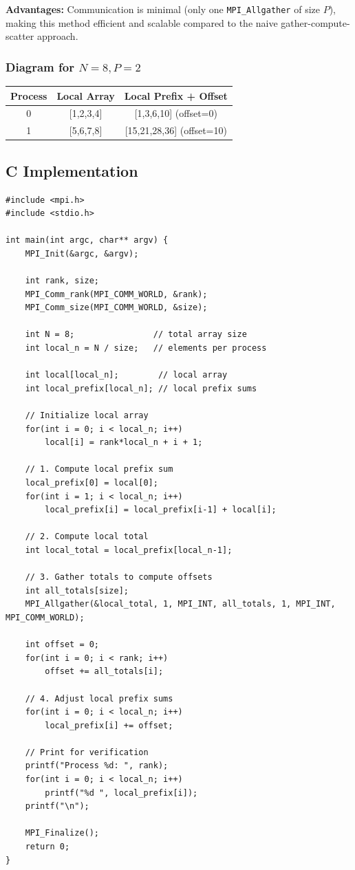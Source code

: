 \documentclass[a4paper,12pt]{article}
\begin{document}
\textbf{Advantages:} Communication is minimal (only one \texttt{MPI\_Allgather} of size $P$), making this method efficient and scalable compared to the naive gather-compute-scatter approach.

\subsubsection{Diagram for $N=8, P=2$}

\begin{center}
\begin{tabular}{|c|c|c|}
\hline
Process & Local Array & Local Prefix + Offset \\
\hline
0 & [1,2,3,4] & [1,3,6,10] (offset=0) \\
1 & [5,6,7,8] & [15,21,28,36] (offset=10) \\
\hline
\end{tabular}
\end{center}

\subsection{C Implementation}

\begin{verbatim}
#include <mpi.h>
#include <stdio.h>

int main(int argc, char** argv) {
    MPI_Init(&argc, &argv);

    int rank, size;
    MPI_Comm_rank(MPI_COMM_WORLD, &rank);
    MPI_Comm_size(MPI_COMM_WORLD, &size);

    int N = 8;                // total array size
    int local_n = N / size;   // elements per process

    int local[local_n];        // local array
    int local_prefix[local_n]; // local prefix sums

    // Initialize local array
    for(int i = 0; i < local_n; i++)
        local[i] = rank*local_n + i + 1;

    // 1. Compute local prefix sum
    local_prefix[0] = local[0];
    for(int i = 1; i < local_n; i++)
        local_prefix[i] = local_prefix[i-1] + local[i];

    // 2. Compute local total
    int local_total = local_prefix[local_n-1];

    // 3. Gather totals to compute offsets
    int all_totals[size];
    MPI_Allgather(&local_total, 1, MPI_INT, all_totals, 1, MPI_INT, MPI_COMM_WORLD);

    int offset = 0;
    for(int i = 0; i < rank; i++)
        offset += all_totals[i];

    // 4. Adjust local prefix sums
    for(int i = 0; i < local_n; i++)
        local_prefix[i] += offset;

    // Print for verification
    printf("Process %d: ", rank);
    for(int i = 0; i < local_n; i++)
        printf("%d ", local_prefix[i]);
    printf("\n");

    MPI_Finalize();
    return 0;
}
\end{verbatim}
\end{document}

